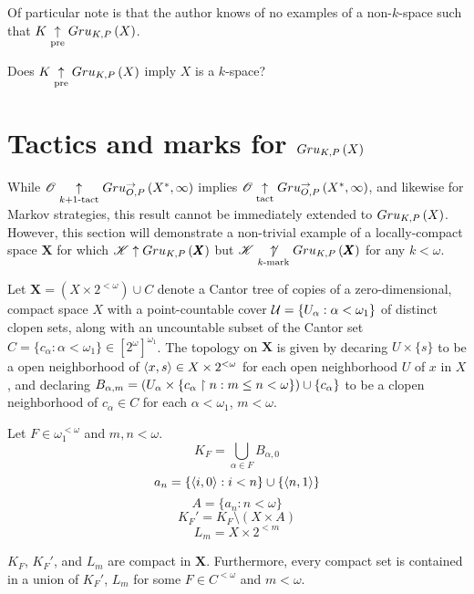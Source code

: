 Of particular note is that the author knows of no examples of a
non-$k$-space such that $K\underset{\text{pre}}{\uparrow}Gru_{K,P}\left({X}\right)$.

\begin{ques}
  Does $K\underset{\text{pre}}{\uparrow}Gru_{K,P}\left({X}\right)$ imply $X$ is a $k$-space?
\end{ques}


\section{Tactics and marks for $Gru_{K,P}\left({X}\right)$}

While $\mathscr{O}\underset{k+1\text{-tact}}{\uparrow}Gru_{O,P}^{\to}\left({X^*},{\infty}\right)$ implies
$\mathscr{O}\underset{\text{tact}}{\uparrow}Gru_{O,P}^{\to}\left({X^*},{\infty}\right)$, and likewise for Markov
strategies, this result cannot be
immediately extended to $Gru_{K,P}\left({X}\right)$. However, this section will
demonstrate a non-trivial example of a locally-compact space $\pmb X$ for which
$\mathscr{K}\uparrow Gru_{K,P}\left({\pmb X}\right)$ but $\mathscr{K}\underset{k\text{-mark}}{\not\uparrow}Gru_{K,P}\left({\pmb X}\right)$
for any $k<\omega$.

\begin{defn}
  Let $\pmb X=(X\times 2^{<\omega})\cup C$ denote a Cantor tree
  of copies of a zero-dimensional, compact space $X$ with a point-countable
  cover $\mathcal{U} = \{U_\alpha : \alpha<\omega_1\}$ of distinct
  clopen sets, along with an uncountable subset of the Cantor set
  $C=\{c_\alpha:\alpha<\omega_1\}\in [2^\omega]^{\omega_1}$.
  The topology on $\pmb X$ is given by decaring $U\times\{s\}$ to be a open
  neighborhood of $\langle x,s\rangle\in X\times 2^{<\omega}$ for each
  open neighborhood $U$ of $x$ in $X$, and declaring
  $B_{\alpha,m}=(U_\alpha\times\{c_\alpha\restriction n: m\leq n<\omega\})\cup\{c_\alpha\}$
  to be a clopen neighborhood of $c_\alpha\in C$ for each $\alpha<\omega_1$,
  $m<\omega$.
\end{defn}

\begin{defn}
  Let $F\in \omega_1^{<\omega}$ and $m,n<\omega$.
  \[
    K_F = \bigcup_{\alpha \in F} B_{\alpha,0}
  \]
  \[
    a_n = \{\langle i,0\rangle:i<n\}\cup\{\langle n,1\rangle\}
  \]
  \[
    A = \{a_n : n<\omega\}
  \]
  \[
    K_F' = K_F \setminus (X \times A)
  \]
  \[
    L_m = X \times 2^{<m}
  \]
\end{defn}

\begin{lem}
  $K_F$, $K_F'$, and $L_m$ are compact in $\pmb X$.
  Furthermore, every compact set is contained in a union of $K_F'$, $L_m$
  for some $F\in C^{<\omega}$ and $m<\omega$.
\end{lem}


